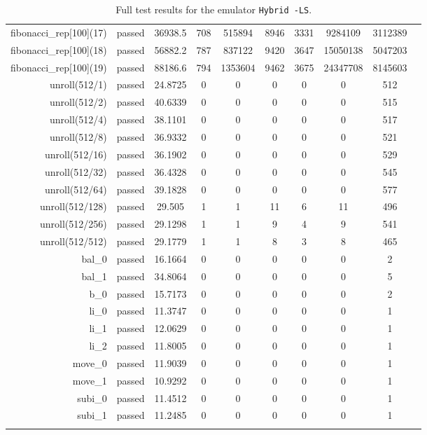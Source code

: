 \begin{longtable}{r|ccccccccc}
    fibonacci\_rep[100](17) & passed & 36938.5 & 708 & 515894 & 8946 & 3331 & 9284109 & 3112389 \\
    fibonacci\_rep[100](18) & passed & 56882.2 & 787 & 837122 & 9420 & 3647 & 15050138 & 5047203 \\
    fibonacci\_rep[100](19) & passed & 88186.6 & 794 & 1353604 & 9462 & 3675 & 24347708 & 8145603 \\
    unroll(512/1) & passed & 24.8725 & 0 & 0 & 0 & 0 & 0 & 512 \\
    unroll(512/2) & passed & 40.6339 & 0 & 0 & 0 & 0 & 0 & 515 \\
    unroll(512/4) & passed & 38.1101 & 0 & 0 & 0 & 0 & 0 & 517 \\
    unroll(512/8) & passed & 36.9332 & 0 & 0 & 0 & 0 & 0 & 521 \\
    unroll(512/16) & passed & 36.1902 & 0 & 0 & 0 & 0 & 0 & 529 \\
    unroll(512/32) & passed & 36.4328 & 0 & 0 & 0 & 0 & 0 & 545 \\
    unroll(512/64) & passed & 39.1828 & 0 & 0 & 0 & 0 & 0 & 577 \\
    unroll(512/128) & passed & 29.505 & 1 & 1 & 11 & 6 & 11 & 496 \\
    unroll(512/256) & passed & 29.1298 & 1 & 1 & 9 & 4 & 9 & 541 \\
    unroll(512/512) & passed & 29.1779 & 1 & 1 & 8 & 3 & 8 & 465 \\
    bal\_0 & passed & 16.1664 & 0 & 0 & 0 & 0 & 0 & 2 \\
    bal\_1 & passed & 34.8064 & 0 & 0 & 0 & 0 & 0 & 5 \\
    b\_0 & passed & 15.7173 & 0 & 0 & 0 & 0 & 0 & 2 \\
    li\_0 & passed & 11.3747 & 0 & 0 & 0 & 0 & 0 & 1 \\
    li\_1 & passed & 12.0629 & 0 & 0 & 0 & 0 & 0 & 1 \\
    li\_2 & passed & 11.8005 & 0 & 0 & 0 & 0 & 0 & 1 \\
    move\_0 & passed & 11.9039 & 0 & 0 & 0 & 0 & 0 & 1 \\
    move\_1 & passed & 10.9292 & 0 & 0 & 0 & 0 & 0 & 1 \\
    subi\_0 & passed & 11.4512 & 0 & 0 & 0 & 0 & 0 & 1 \\
    subi\_1 & passed & 11.2485 & 0 & 0 & 0 & 0 & 0 & 1 \\

    \bottomrule
    \caption{Full test results for the emulator \texttt{Hybrid -LS}.}
    \label{tbl:full-test-output-hybrid-LS}
\end{longtable}